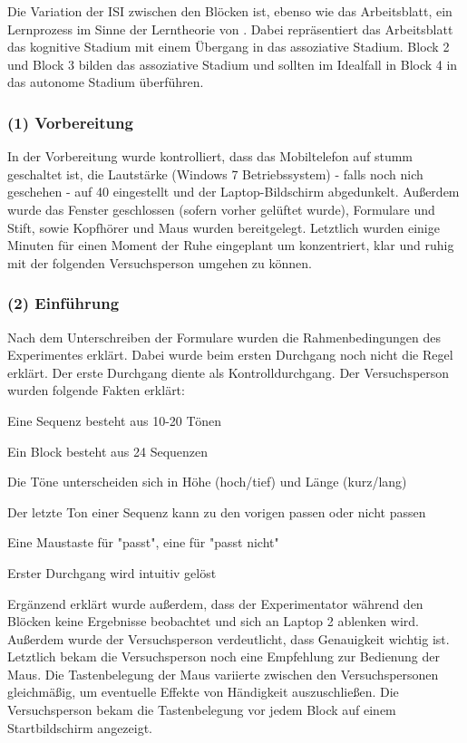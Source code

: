 \documentclass[doc,a4paper,12pt]{apa6}
\begin{document}
Die Variation der ISI zwischen den Blöcken ist, ebenso wie das Arbeitsblatt, ein Lernprozess im Sinne der Lerntheorie von \textcite{fitts1967human}. Dabei repräsentiert das Arbeitsblatt das kognitive Stadium mit einem Übergang in das assoziative Stadium. Block 2 und Block 3 bilden das assoziative Stadium und sollten im Idealfall in Block 4 in das autonome Stadium überführen.

\subsubsection{(1) Vorbereitung}

In der Vorbereitung wurde kontrolliert, dass das Mobiltelefon auf stumm geschaltet ist, die Lautstärke (Windows 7 Betriebssystem) - falls noch nich geschehen - auf 40 eingestellt und der Laptop-Bildschirm abgedunkelt. Außerdem wurde das Fenster geschlossen (sofern vorher gelüftet wurde), Formulare und Stift, sowie Kopfhörer und Maus wurden bereitgelegt. Letztlich wurden einige Minuten für einen Moment der Ruhe eingeplant um konzentriert, klar und ruhig mit der folgenden Versuchsperson umgehen zu können.

\subsubsection{(2) Einführung}

Nach dem Unterschreiben der Formulare wurden die Rahmenbedingungen des Experimentes erklärt. Dabei wurde beim ersten Durchgang noch nicht die Regel erklärt. Der erste Durchgang diente als Kontrolldurchgang. Der Versuchsperson wurden folgende Fakten erklärt:

\begin{compactitem}
\item Eine Sequenz besteht aus 10-20 Tönen
\item Ein Block besteht aus 24 Sequenzen
\item Die Töne unterscheiden sich in Höhe (hoch/tief) und Länge (kurz/lang)
\item Der letzte Ton einer Sequenz kann zu den vorigen passen oder nicht passen
\item Eine Maustaste für "passt", eine für "passt nicht"
\item Erster Durchgang wird intuitiv gelöst
\end{compactitem}

Ergänzend erklärt wurde außerdem, dass der Experimentator während den Blöcken keine Ergebnisse beobachtet und sich an Laptop 2 ablenken wird. Außerdem wurde der Versuchsperson verdeutlicht, dass Genauigkeit wichtig ist. Letztlich bekam die Versuchsperson noch eine Empfehlung zur Bedienung der Maus. Die Tastenbelegung der Maus variierte zwischen den Versuchspersonen gleichmäßig, um eventuelle Effekte von Händigkeit auszuschließen. Die Versuchsperson bekam die Tastenbelegung vor jedem Block auf einem Startbildschirm angezeigt.
\end{document}
